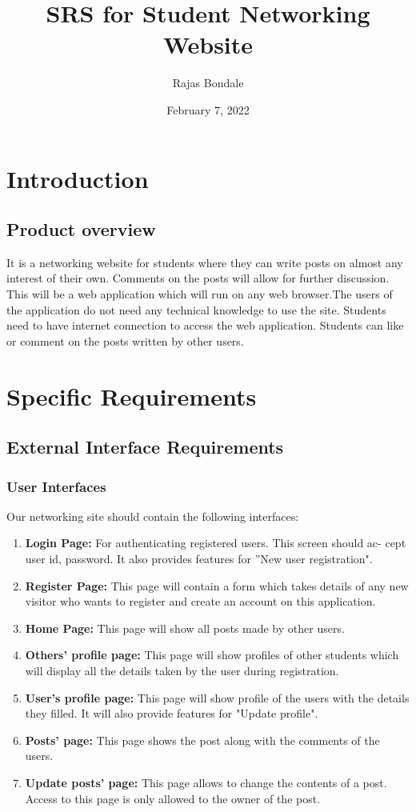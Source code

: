 \documentclass[12pt, letterpaper, twoside]{article}
\title{SRS for Student Networking Website}
\author{Rajas Bondale}
\date{February 7, 2022}
\begin{document}
\maketitle

\section{Introduction}
\subsection{Product overview}
It is a networking website for students where they can write posts on almost any interest of their own. Comments on the posts will allow for further discussion. This will be a web application which will run on any web browser.The users of the application do not need any technical knowledge to use the site. Students need to have internet connection to access the web application. Students can like or comment on the posts written by other users. 
	
\section{Specific Requirements}
\subsection{External Interface Requirements}
\subsubsection{User Interfaces}
Our networking site should contain the following interfaces:
\begin{enumerate}
\item \textbf{Login Page:} For authenticating registered users. This screen should ac-
cept user id, password. It also provides features for ”New user registration". 
\item \textbf{Register Page:} This page will contain a form which takes details of any new
visitor who wants to register and create an account on this application.
\item \textbf{Home Page:} This page will show all posts made by other users.
\item \textbf{Others' profile page: } This page will show profiles of other students which will display all the details taken by the user during registration. 
\item \textbf{User's profile page: } This page will show profile of the users with the details they filled. It will also provide features for "Update profile". 
\item \textbf{Posts' page: } This page shows the post along with the comments of the users. 
\item \textbf{Update posts' page: }This page allows to change the contents of a post. Access to this page is only allowed to the owner of the post. 
\end{enumerate}
\end{document}

